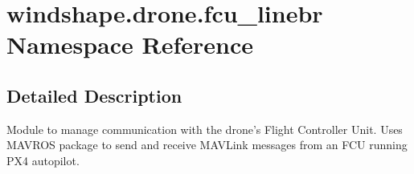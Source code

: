 \hypertarget{namespacewindshape_1_1drone_1_1fcu__linebr}{}\section{windshape.\+drone.\+fcu\+\_\+linebr Namespace Reference}
\label{namespacewindshape_1_1drone_1_1fcu__linebr}


\subsection{Detailed Description}
\begin{DoxyVerb}Module to manage communication with the drone's Flight Controller
Unit. Uses MAVROS package to send and receive MAVLink messages from
an FCU running PX4 autopilot.
\end{DoxyVerb}
 